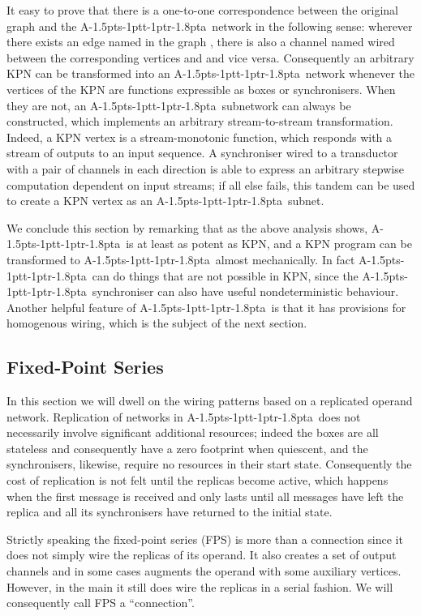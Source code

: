 \documentclass[11pt]{report}
\def\ak{{\textsf{A\kern-1.5pts\kern-1ptt\kern-1ptr\kern-1.8pta}}\kern-2pt{\it K\kern-2ptahn}}
\begin{document}
It easy to prove that there is a one-to-one correspondence between the original graph and the \ak\ network in the following sense:
wherever there exists an edge  named  in the graph , there is also a channel named  wired between the corresponding vertices  and  and vice versa. Consequently an arbitrary KPN can be transformed into an \ak\ network
whenever the vertices of the KPN are functions expressible as boxes or synchronisers. When they are not, an \ak\ subnetwork can always be constructed, which implements an arbitrary stream-to-stream transformation. Indeed, a KPN vertex is a stream-monotonic function, which
responds with a stream of outputs to an input sequence. A synchroniser wired to a transductor with a pair of channels in each direction is able to express an arbitrary stepwise computation dependent on input streams; if all else fails, this tandem can be used to create a KPN vertex as an \ak\ subnet.

We conclude this section by remarking that as the above analysis shows, \ak\ is at least as potent as KPN, and a KPN program can be
transformed to \ak\ almost mechanically. In fact \ak\ can do things that are not possible in KPN, since the \ak\ synchroniser can also have useful nondeterministic behaviour. Another helpful feature of \ak\ is that it has provisions for homogenous wiring, which is the subject of the next section.


\subsection{Fixed-Point Series\label{sec:fps}}

In this section we will dwell on the wiring patterns based on a replicated operand network. Replication of networks
in \ak\ does not necessarily involve significant additional resources; indeed the boxes are all stateless and consequently have a zero footprint when quiescent, and the synchronisers, likewise, require no resources in their start state. Consequently the cost of replication is not felt until the replicas become active, which happens when the first message is received and only lasts until all messages have left the replica and all its synchronisers have returned to the initial state.

Strictly speaking the fixed-point series (FPS) is more than a connection since it does not simply wire the replicas of its operand. It also creates a set of output channels and in some cases augments the operand with some auxiliary vertices. However, in the main it still does wire the replicas in a serial fashion. We will consequently call FPS a ``connection''.
\end{document}
